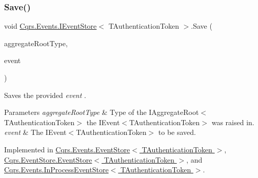\mbox{\label{interfaceCqrs_1_1Events_1_1IEventStore_a81fb586703e7c6dea6b23d9a95f3887a_a81fb586703e7c6dea6b23d9a95f3887a}} 
\subsubsection{\texorpdfstring{Save()}{Save()}}
{\footnotesize\ttfamily void \hyperlink{interfaceCqrs_1_1Events_1_1IEventStore}{Cqrs.\+Events.\+I\+Event\+Store}$<$ T\+Authentication\+Token $>$.Save (\begin{DoxyParamCaption}\item[{Type}]{aggregate\+Root\+Type,  }\item[{\hyperlink{interfaceCqrs_1_1Events_1_1IEvent}{I\+Event}$<$ T\+Authentication\+Token $>$ @}]{event }\end{DoxyParamCaption})}



Saves the provided {\itshape event} . 


\begin{DoxyParams}{Parameters}
{\em aggregate\+Root\+Type} & Type of the I\+Aggregate\+Root$<$\+T\+Authentication\+Token$>$ the I\+Event$<$\+T\+Authentication\+Token$>$ was raised in.\\
\hline
{\em event} & The I\+Event$<$\+T\+Authentication\+Token$>$ to be saved.\\
\hline
\end{DoxyParams}


Implemented in \hyperlink{classCqrs_1_1Events_1_1EventStore_a3ba5ba04a36382b6d36a6ad8867dc766_a3ba5ba04a36382b6d36a6ad8867dc766}{Cqrs.\+Events.\+Event\+Store$<$ T\+Authentication\+Token $>$}, \hyperlink{classCqrs_1_1EventStore_1_1EventStore_adce33037e2a3eb81cfccded42ba2ed35_adce33037e2a3eb81cfccded42ba2ed35}{Cqrs.\+Event\+Store.\+Event\+Store$<$ T\+Authentication\+Token $>$}, and \hyperlink{classCqrs_1_1Events_1_1InProcessEventStore_a93e6d7dc5b81ffba6a89cf22b273d0c9_a93e6d7dc5b81ffba6a89cf22b273d0c9}{Cqrs.\+Events.\+In\+Process\+Event\+Store$<$ T\+Authentication\+Token $>$}.

\mbox{\label{interfaceCqrs_1_1Events_1_1IEventStore_a92e768243d6602d09b786bbd06811ce6_a92e768243d6602d09b786bbd06811ce6}} 
